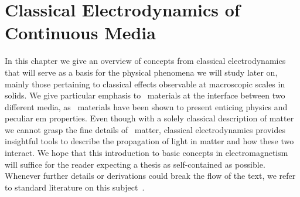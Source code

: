 
%

\chapter{Classical Electrodynamics of Continuous Media}
\label{ch:classical_electrodynamics}
\glsresetall
In this chapter we give an overview of concepts from classical electrodynamics that will serve as a basis for the physical phenomena we will study later on, mainly those pertaining to classical effects observable at macroscopic scales in solids.
We give particular emphasis to \bd~materials at the interface between two different media, as \bd~materials have been shown to present enticing physics and peculiar \gls{em} properties.
Even though with a solely classical description of matter we cannot grasp the fine details of \bd~matter, classical electrodynamics provides insightful tools to describe the propagation of light in matter and how these two interact.
We hope that this introduction to basic concepts in electromagnetism will suffice for the reader expecting a thesis as self-contained as possible.
Whenever further details or derivations could break the flow of the text, we refer to standard literature on this subject~\cite{Jackson:electrodynamics,Loureiro_Elementos_de_ECLA,Griffiths_2023}.\\

